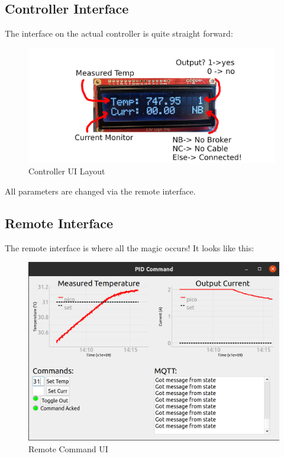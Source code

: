 \documentclass[11pt, letterpaper]{article}
\begin{document}
\subsection{Controller Interface}

The interface on the actual controller is quite straight forward:

\begin{figure}[H]
    \centering
    \includegraphics[width=11cm]{screen.jpg}
    \caption{ Controller UI Layout }
    \label{fig:screen}
\end{figure}

All parameters are changed via the remote interface.

\subsection{Remote Interface}

The remote interface is where all the magic occurs! It looks like this:

\begin{figure}[H]
    \centering
    \includegraphics[width=12cm]{command_ui.png}
    \caption{ Remote Command UI }
    \label{fig:command_ui}
\end{figure}
\end{document}
